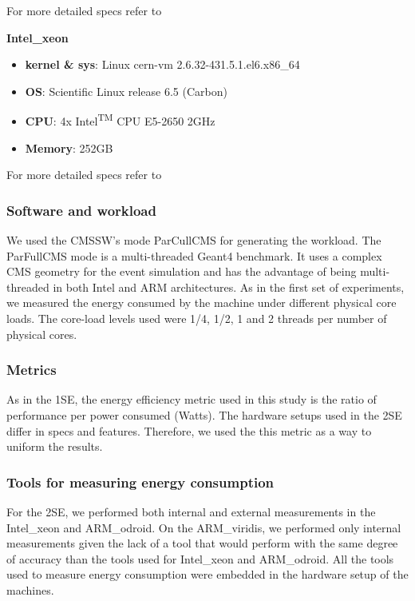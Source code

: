For more detailed specs refer to \cite{odroid_specs}


\vspace{10mm}
\textbf{Intel\_xeon}
\begin{itemize}
  \item[] \textbf{kernel \& sys}:  Linux cern-vm 2.6.32-431.5.1.el6.x86\_64
  \item[] \textbf{OS}: Scientific Linux release 6.5 (Carbon)
  \item[] \textbf{CPU}:    4x Intel\textsuperscript{TM} CPU E5-2650 \@2GHz
  \item[] \textbf{Memory}:        252GB
\end{itemize}

For more detailed specs refer to \cite{xeon_specs}


\subsubsection*{Software and workload}
We used the CMSSW's mode ParCullCMS for generating the workload. The ParFullCMS mode is a multi-threaded Geant4 \cite{GEANT4} benchmark. It uses a complex CMS geometry for the event simulation and has the advantage of being multi-threaded in both Intel and ARM architectures. As in the first set of experiments, we measured the energy consumed by the machine under different physical core loads. The core-load levels used were 1/4, 1/2, 1 and 2 threads per number of physical cores. 

\subsubsection*{Metrics}
As in the 1SE, the energy efficiency metric used in this study is the ratio of performance per power consumed (Watts). The hardware setups used in the 2SE differ in specs and features. Therefore, we used the this metric as a way to uniform the results.

\subsubsection*{Tools for measuring energy consumption}
For the 2SE, we performed both internal and external measurements in the Intel\_xeon and ARM\_odroid. On the ARM\_viridis, we performed only internal measurements given the lack of a tool that would perform with the same degree of accuracy than the tools used for Intel\_xeon and ARM\_odroid. All the tools used to measure energy consumption were embedded in the hardware setup of the machines.

